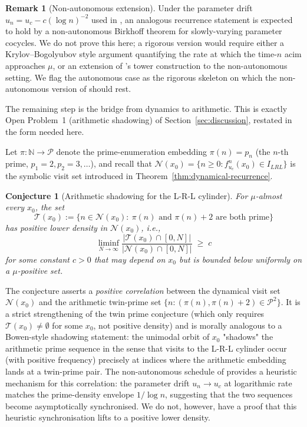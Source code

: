 \documentclass[11pt,a4paper]{article}
\newtheorem{conjecture}{Conjecture}
\theoremstyle{definition}
\newtheorem{remark}{Remark}
\begin{document}
\begin{remark}[Non-autonomous extension]
\label{rem:non-auto}
Under the parameter drift $u_n = u_c - c (\log n)^{-2}$ used in
\cite{wang2026emergence}, an analogous recurrence statement is expected
to hold by a non-autonomous Birkhoff theorem for slowly-varying
parameter cocycles. We do not prove this here; a rigorous version
would require either a Krylov--Bogolyubov style argument quantifying
the rate at which the time-$n$ acim approaches $\mu$, or an extension
of \cite{young1992decay}'s tower construction to the non-autonomous
setting. We flag the autonomous case as the rigorous skeleton on which
the non-autonomous version of \cite{wang2026emergence} should rest.
\end{remark}

The remaining step is the bridge from dynamics to arithmetic. This is
exactly Open Problem~1 (arithmetic shadowing) of
Section~\ref{sec:discussion}, restated in the form needed here.

Let $\pi : \mathbb{N} \to \mathcal{P}$ denote the prime-enumeration
embedding $\pi(n) = p_n$ (the $n$-th prime, $p_1 = 2, p_2 = 3, \ldots$),
and recall that $\mathcal{N}(x_0) = \{ n \geq 0 : f_{u_c}^n(x_0) \in I_{LRL}\}$
is the symbolic visit set introduced in
Theorem~\ref{thm:dynamical-recurrence}.

\begin{conjecture}[Arithmetic shadowing for the L-R-L cylinder]
\label{conj:arith-shadow-LRL}
For $\mu$-almost every $x_0$, the set
\[
    \mathcal{T}(x_0) := \{ n \in \mathcal{N}(x_0) :\
        \pi(n) \text{ and } \pi(n) + 2 \text{ are both prime} \}
\]
has positive lower density in $\mathcal{N}(x_0)$, i.e.,
\[
    \liminf_{N \to \infty}
    \frac{|\mathcal{T}(x_0) \cap [0, N]|}{|\mathcal{N}(x_0) \cap [0, N]|}
    \;\geq\; c
\]
for some constant $c > 0$ that may depend on $x_0$ but is bounded
below uniformly on a $\mu$-positive set.
\end{conjecture}

The conjecture asserts a \emph{positive correlation} between the
dynamical visit set $\mathcal{N}(x_0)$ and the arithmetic twin-prime
set $\{n : (\pi(n), \pi(n)+2) \in \mathcal{P}^2\}$. It is a strict
strengthening of the twin prime conjecture (which only requires
$\mathcal{T}(x_0) \neq \emptyset$ for some $x_0$, not positive density)
and is morally analogous to a Bowen-style shadowing statement: the
unimodal orbit of $x_0$ "shadows" the arithmetic prime sequence in the
sense that visits to the L-R-L cylinder occur (with positive
frequency) precisely at indices where the arithmetic embedding lands
at a twin-prime pair. The non-autonomous schedule of
\cite{wang2026emergence} provides a heuristic mechanism for this
correlation: the parameter drift $u_n \to u_c$ at logarithmic rate
matches the prime-density envelope $1/\log n$, suggesting that the
two sequences become asymptotically synchronised. We do not, however,
have a proof that this heuristic synchronisation lifts to a positive
lower density.
\end{document}
